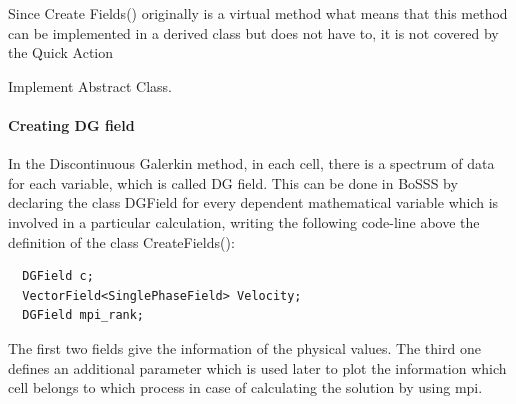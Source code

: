 \documentclass[11pt,twoside,a4paper]{fdyartcl}
\begin{document}
Since {\scriptsize Create Fields()} originally is a virtual method what means that this method can be implemented in a derived class but does not have to, it is not covered by the Quick Action {\scriptsize Implement Abstract Class. 
\paragraph{Creating DG field}
In the Discontinuous Galerkin method, in each cell, there is a spectrum of data for each variable, which is called DG field. This can be done in BoSSS by declaring the class {\scriptsize DGField} for every dependent mathematical variable which is involved in a particular calculation, writing the following code-line above the definition of the class CreateFields():
{\scriptsize \begin{verbatim}
  DGField c;
  VectorField<SinglePhaseField> Velocity;
  DGField mpi_rank;
\end{verbatim}}
The first two fields give the information of the physical values. The third one defines an additional parameter which is used later to plot the information which cell belongs to which process in case of calculating the solution by using mpi.
}
\end{document}
